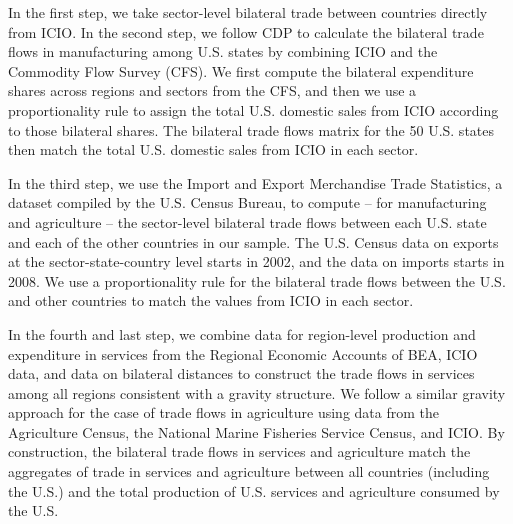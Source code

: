 \documentclass[12pt]{article}
\begin{document}
In the first step, we take sector-level bilateral trade between countries directly from ICIO. In the second step, we follow CDP to calculate the bilateral trade flows in manufacturing among U.S. states by combining ICIO and the Commodity Flow Survey (CFS). We first compute the bilateral expenditure shares across regions and sectors from the CFS, and then we use a proportionality rule to assign the total U.S. domestic sales from ICIO according to those bilateral shares. The bilateral trade flows matrix for the 50 U.S. states then match the total U.S. domestic sales from ICIO in each sector.

In the third step, we use the Import and Export Merchandise Trade Statistics, a dataset compiled by the U.S. Census Bureau, to compute -- for manufacturing and agriculture -- the sector-level bilateral trade flows between each U.S. state and each of the other countries in our sample. The U.S. Census data on exports at the sector-state-country level starts in 2002, and the data on imports starts in 2008. We use a proportionality rule for the bilateral trade flows between the U.S. and other countries to match the values from ICIO in each sector.

In the fourth and last step, we combine data for region-level production and expenditure in services from the Regional Economic Accounts of BEA, ICIO data, and data on bilateral distances to construct the trade flows in services among all regions consistent with a gravity structure. We follow a similar gravity approach for the case of trade flows in agriculture using data from the Agriculture Census, the National Marine Fisheries Service Census, and ICIO. By construction, the bilateral trade flows in services and agriculture match the aggregates of trade in services and agriculture between all countries (including the U.S.) and the total production of U.S. services and agriculture consumed by the U.S. 
\end{document}
